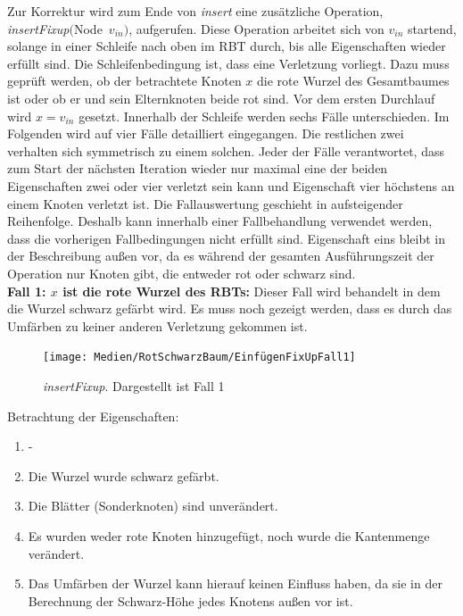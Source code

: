 \documentclass[a4paper,12pt]{article}
\begin{document}
\noindent Zur Korrektur wird zum Ende von \textit{insert} eine zusätzliche Operation,\\  \mbox{\textit{insertFixup}$($Node $v_{in})$}, aufgerufen. Diese Operation arbeitet sich von $v_{in}$ startend, solange in einer Schleife nach oben im RBT durch, bis alle Eigenschaften wieder erfüllt sind. Die Schleifenbedingung ist, dass eine Verletzung vorliegt. Dazu muss geprüft werden, ob der betrachtete Knoten $x$ die rote Wurzel des Gesamtbaumes ist oder ob er und sein Elternknoten beide rot sind. Vor dem ersten Durchlauf wird $x = v_{in}$ gesetzt. Innerhalb der Schleife werden sechs Fälle unterschieden. Im Folgenden wird auf vier Fälle detailliert eingegangen. Die restlichen zwei verhalten sich symmetrisch zu einem solchen. Jeder der Fälle verantwortet, dass zum Start der nächsten Iteration wieder nur maximal eine der beiden Eigenschaften zwei oder vier verletzt sein kann und Eigenschaft vier höchstens an einem Knoten verletzt ist. Die Fallauswertung geschieht in aufsteigender Reihenfolge. Deshalb kann innerhalb einer Fallbehandlung verwendet werden, dass die vorherigen Fallbedingungen nicht erfüllt sind. Eigenschaft eins bleibt in der Beschreibung außen vor, da es während der gesamten Ausführungszeit der Operation nur Knoten gibt, die entweder rot oder schwarz sind. \\

\noindent\textbf{Fall 1: $x$ ist die rote Wurzel des RBTs: }
Dieser Fall wird behandelt in dem die Wurzel schwarz gefärbt wird. Es muss noch gezeigt werden, dass es durch das Umfärben zu keiner anderen Verletzung gekommen ist.\\
\begin{figure}[H]
	\centering
	\texttt{[image: Medien/RotSchwarzBaum/EinfügenFixUpFall1]}
	\caption{\textit{insertFixup}. Dargestellt ist Fall 1  }
	\label{fig:EinfügenFixUpFall1}
\end{figure}

Betrachtung der Eigenschaften:
\begin{enumerate}
	\item -
	\item Die Wurzel wurde schwarz gefärbt.
	\item Die Blätter (Sonderknoten) sind unverändert.
	\item Es wurden weder rote Knoten hinzugefügt, noch wurde die Kantenmenge verändert. 
	\item Das Umfärben der Wurzel kann hierauf keinen Einfluss haben, da sie in der Berechnung der Schwarz-Höhe jedes Knotens außen vor ist.
\end{enumerate}  
\end{document}
